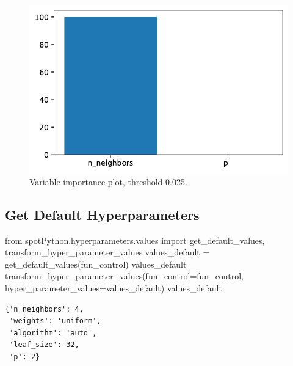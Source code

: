 \documentclass[
  letterpaper,
  DIV=11,
  numbers=noendperiod]{scrreprt}
\newenvironment{Shaded}{\begin{snugshade}}{\end{snugshade}}
\newcommand{\ImportTok}[1]{\textcolor[rgb]{0.00,0.46,0.62}{#1}}
\newcommand{\NormalTok}[1]{\textcolor[rgb]{0.00,0.23,0.31}{#1}}
\newcommand{\OperatorTok}[1]{\textcolor[rgb]{0.37,0.37,0.37}{#1}}
\begin{document}
\begin{figure}[H]

{\centering \includegraphics{19_spot_hpt_sklearn_multiclass_classification_knn_files/figure-pdf/cell-28-output-1.pdf}

}

\caption{Variable importance plot, threshold 0.025.}

\end{figure}

\hypertarget{get-default-hyperparameters-6}{%
\subsection{Get Default
Hyperparameters}\label{get-default-hyperparameters-6}}

\begin{Shaded}
\begin{Highlighting}[]
\ImportTok{from}\NormalTok{ spotPython.hyperparameters.values }\ImportTok{import}\NormalTok{ get\_default\_values, transform\_hyper\_parameter\_values}
\NormalTok{values\_default }\OperatorTok{=}\NormalTok{ get\_default\_values(fun\_control)}
\NormalTok{values\_default }\OperatorTok{=}\NormalTok{ transform\_hyper\_parameter\_values(fun\_control}\OperatorTok{=}\NormalTok{fun\_control, hyper\_parameter\_values}\OperatorTok{=}\NormalTok{values\_default)}
\NormalTok{values\_default}
\end{Highlighting}
\end{Shaded}

\begin{verbatim}
{'n_neighbors': 4,
 'weights': 'uniform',
 'algorithm': 'auto',
 'leaf_size': 32,
 'p': 2}
\end{verbatim}
\end{document}
